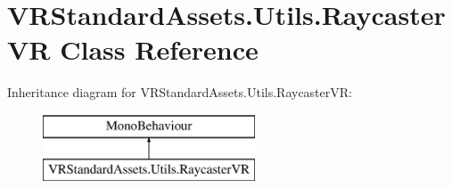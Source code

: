 \hypertarget{class_v_r_standard_assets_1_1_utils_1_1_raycaster_v_r}{}\section{V\+R\+Standard\+Assets.\+Utils.\+Raycaster\+VR Class Reference}
\label{class_v_r_standard_assets_1_1_utils_1_1_raycaster_v_r}
Inheritance diagram for V\+R\+Standard\+Assets.\+Utils.\+Raycaster\+VR\+:\begin{figure}[H]
\begin{center}
\leavevmode
\includegraphics[height=2.000000cm]{class_v_r_standard_assets_1_1_utils_1_1_raycaster_v_r}
\end{center}
\end{figure}
